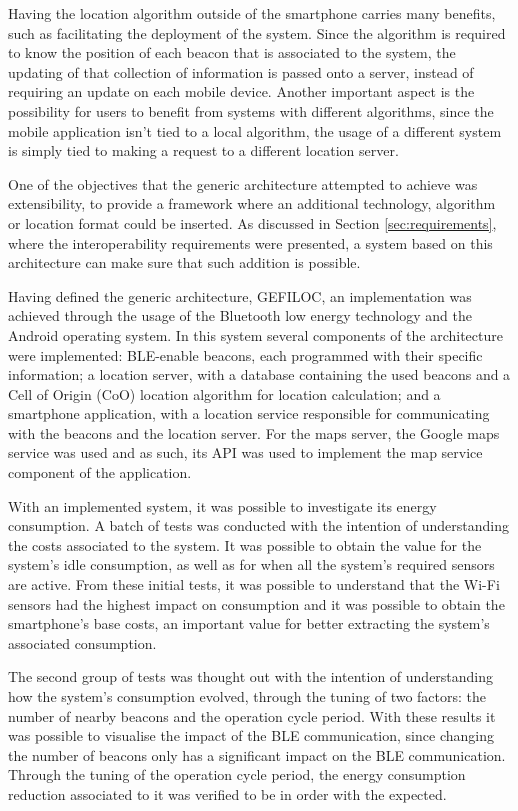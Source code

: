  
Having the location algorithm outside of the smartphone carries many benefits, such as facilitating the deployment of the system. Since the algorithm is required to know the position of each beacon that is associated to the system, the updating of that collection of information is passed onto a server, instead of requiring an update on each mobile device. Another important aspect is the possibility for users to benefit from systems with different algorithms, since the mobile application isn't tied to a local algorithm, the usage of a different system is simply tied to making a request to a different location server.  
 
 
One of the objectives that the generic architecture attempted to achieve was extensibility, to provide a framework where an additional technology, algorithm or location format could be inserted. As discussed in Section \ref{sec:requirements}, where the interoperability requirements were presented, a system based on this architecture can make sure that such addition is possible.  
 
 
Having defined the generic architecture, GEFILOC, an implementation was achieved through the usage of the Bluetooth low energy technology and the Android operating system. In this system several components of the architecture were implemented: BLE-enable beacons, each programmed with their specific information; a location server, with a database containing the used beacons and a Cell of Origin (CoO) location algorithm for location calculation; and a smartphone application, with a location service responsible for communicating with the beacons and the location server. For the maps server, the Google maps service was used and as such, its API was used to implement the map service component of the application. 
 
 
With an implemented system, it was possible to investigate its energy consumption. A batch of tests was conducted with the intention of understanding the costs associated to the system. It was possible to obtain the value for the system's idle consumption, as well as for when all the system's required sensors are active. From these initial tests, it was possible to understand that the Wi-Fi sensors had the highest impact on consumption and it was possible to obtain the smartphone's base costs, an important value for better extracting the system's associated consumption. 
 
 
The second group of tests was thought out with the intention of understanding how the system's consumption evolved, through the tuning of two factors: the number of nearby beacons and the operation cycle period. With these results it was possible to visualise the impact of the BLE communication, since changing the number of beacons only has a significant impact on the BLE communication. Through the tuning of the operation cycle period, the energy consumption reduction associated to it was verified to be in order with the expected. 
 
